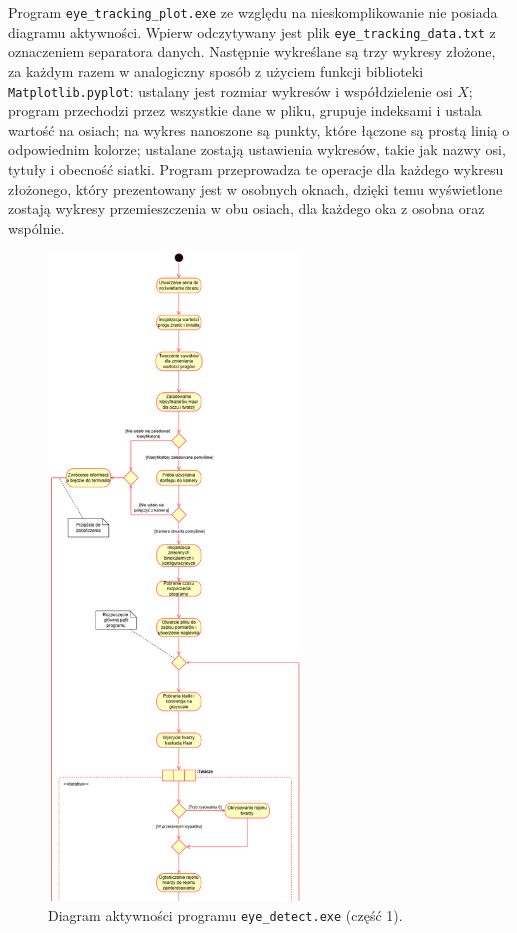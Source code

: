\documentclass[a4paper,twoside,12pt]{book}
\begin{document}
Program \texttt{eye\_\-tracking\_\-plot.exe} ze względu na nieskomplikowanie nie posiada diagramu aktywności. Wpierw odczytywany jest plik \texttt{eye\_tracking\_data.txt} z oznaczeniem separatora danych. Następnie wykreślane są trzy wykresy złożone, za każdym razem w analogiczny sposób z użyciem funkcji biblioteki \texttt{Matplotlib\-.pyplot}: ustalany jest rozmiar wykresów i współdzielenie osi $X$; program przechodzi przez wszystkie dane w pliku, grupuje indeksami i ustala wartość na osiach; na wykres nanoszone są punkty, które łączone są prostą linią o odpowiednim kolorze; ustalane zostają ustawienia wykresów, takie jak nazwy osi, tytuły i obecność siatki. Program przeprowadza te operacje dla każdego wykresu złożonego, który prezentowany jest w osobnych oknach, dzięki temu wyświetlone zostają wykresy przemieszczenia w obu osiach, dla każdego oka z osobna oraz wspólnie.

\begin{figure}[htbp]
	\centering
	\includegraphics[width=0.6\textwidth, height=0.96\textheight]{pic/diagram aktywności/druga próba/diagram aktywności 1.png}
	\caption{Diagram aktywności programu \texttt{eye\-\_detect.exe} (część 1).}
	\label{fig:diagram-aktywnosci-1}
\end{figure}
\end{document}
